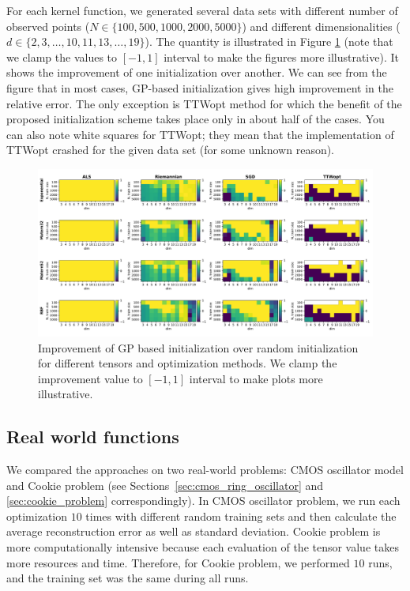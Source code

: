 For each kernel function, we generated several data sets with different number of observed points ($N \in \{100, 500, 1000, 2000, 5000\}$) and different dimensionalities ($d \in \{2, 3, \ldots, 10, 11, 13, \ldots, 19\} $).
The quantity is illustrated in Figure \ref{fig:improvement} (note that we clamp the values to $[-1, 1]$ interval to make the figures more illustrative).
It shows the improvement of one initialization over another.
We can see from the figure that in most cases, GP-based initialization gives high improvement in the relative error.
The only exception is TTWopt method for which the benefit of the proposed initialization scheme takes place only in about half of the cases.
You can also note white squares for TTWopt; they mean that the implementation of TTWopt crashed for the given data set (for some unknown reason).


\begin{figure}
    \centering
    \includegraphics[width=\textwidth]{figures/tensor_completion/gain.pdf}
    \caption{Improvement of GP based initialization over random initialization for different tensors and optimization methods. We clamp the improvement value to $[-1, 1]$ interval to make plots more illustrative.}
    \label{fig:improvement}
\end{figure}

\subsection{Real world functions}
We compared the approaches on two real-world problems:
CMOS oscillator model and Cookie problem
(see Sections~\ref{sec:cmos_ring_oscillator} and \ref{sec:cookie_problem} correspondingly).
In CMOS oscillator problem, we run each optimization $10$ times with different random training sets and then calculate the average reconstruction error as well as standard deviation.
Cookie problem is more computationally intensive because each evaluation of the tensor value takes more resources and time.
Therefore, for Cookie problem, we performed $10$ runs, and the training set was the same during all runs.


